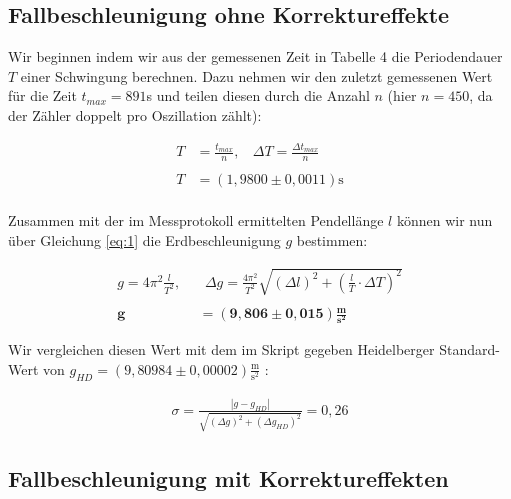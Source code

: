 \documentclass{article}
\begin{document}
\subsection{Fallbeschleunigung ohne Korrektureffekte}

Wir beginnen indem wir aus der gemessenen Zeit in Tabelle 4 die Periodendauer $T$ einer Schwingung berechnen. Dazu nehmen wir den zuletzt gemessenen Wert für die Zeit $t_{max}=891$s und teilen diesen durch die Anzahl $n$ (hier $n=450$, da der Zähler doppelt pro Oszillation zählt):

\begin{equation}
    \begin{split}
        T &= \frac{t_{max}}{n},  \ \  \ \ \Delta T = \frac{\Delta t_{max}}{n} \\ \\
        T &= (1,9800 \pm 0,0011) \text{s} \\
    \end{split}
\end{equation}

Zusammen mit der im Messprotokoll ermittelten Pendellänge $l$ können wir nun über Gleichung \ref{eq:1} die Erdbeschleunigung $g$ bestimmen:

\begin{equation}
    \begin{split}
        g = 4\pi^2 \frac{l}{T^2}, \ \ & \ \ \Delta g = \frac{4 \pi^2}{T^2} \sqrt{\left( \Delta l \right)^2 + \left( \frac{l}{T} \cdot \Delta T \right)^2} \\ \\
        \bm{g} &= \bm{(9,806 \pm 0,015) \frac{\textbf{m}}{\textbf{s}^2}}
    \end{split}
\end{equation}

Wir vergleichen diesen Wert mit dem im Skript gegeben Heidelberger Standard-Wert von $g_{HD} = (9,80984 \pm 0,00002) \frac{\text{m}}{\text{s}^2}$ :

\begin{equation}
    \begin{split}
        \sigma = \frac{|g-g_{HD}|}{\sqrt{(\Delta g)^2+(\Delta g_{HD})^2}} = 0,26
    \end{split}
\end{equation}

\subsection{Fallbeschleunigung mit Korrektureffekten}
\end{document}

